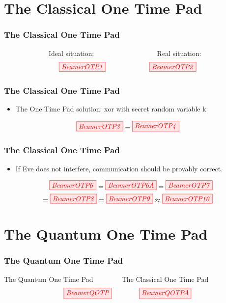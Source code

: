 \documentclass[]{beamer}
\begin{document}
\section{The Classical One Time Pad}
\begin{frame}
	\centering 
	\Huge
\end{frame}
\begin{frame}
	\frametitle{The Classical One Time Pad}
	~~~~~~~~~~~~~Ideal situation:  ~~~~~~~~~~~~~~~~~ Real situation:
	\begin{equation}
	\tikzfig{BeamerOTP1} ~~~~~~~~~~~~~~~~~~~ \tikzfig{BeamerOTP2}
 	\end{equation}
\end{frame}

\begin{frame}
	\frametitle{The Classical One Time Pad}
	\begin{itemize}
	\item The One Time Pad solution: xor with secret random variable k
	\vspace{0.5cm}
	\end{itemize}
\begin{equation}
	\tikzfig{BeamerOTP3} = \tikzfig{BeamerOTP4} %
\end{equation}
\end{frame}

\begin{frame}
	\frametitle{The Classical One Time Pad}
	\begin{itemize}
	\item If Eve does not interfere, communication should be
	provably correct.
	\end{itemize}
\begin{equation}
	\begin{split}
	\tikzfig{BeamerOTP6} = \tikzfig{BeamerOTP6A} = \tikzfig{BeamerOTP7} \\ = \tikzfig{BeamerOTP8} = \tikzfig{BeamerOTP9} \approx \tikzfig{BeamerOTP10}
	\end{split} 
\end{equation}
\end{frame}

\section{The Quantum One Time Pad}
\begin{frame}
	\centering 
	\Huge
\end{frame}
\begin{frame}
	\frametitle{The Quantum One Time Pad}
	The Quantum One Time Pad ~~~~~~~ The Classical One Time Pad
	\begin{equation}
	\tikzfig{BeamerQOTP} ~~~~~~~~~~~~ \tikzfig{BeamerQOTPA}
	\end{equation}
\end{frame}
\end{document}
